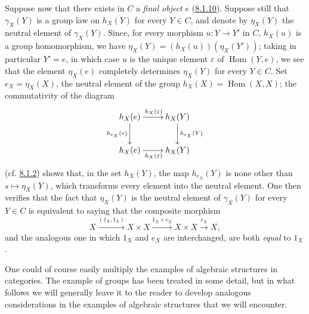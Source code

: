 \begin{env}[8.2.7]
\label{0.8.2.7}
Suppose now that there exists in $C$ a \emph{final object} $e$
(\hyperref[0.8.1.10]{8.1.10}). Suppose still that $\gamma_X(Y)$ is
a group law on $h_X(Y)$ for every $Y\in C$, and denote by
$\eta_X(Y)$ the neutral element of $\gamma_X(Y)$. Since, for every morphism
$u:Y\to Y'$ in $C$, $h_X(u)$ is a group homomorphism, we have
$\eta_X(Y)=(h_X(u))(\eta_X(Y'))$; taking in particular $Y'=e$, in which case
$u$ is the unique element $\varepsilon$ of $\operatorname{Hom}(Y,e)$, we see
that the element $\eta_X(e)$ completely determines $\eta_X(Y)$ for every
$Y\in C$. Set $e_X=\eta_X(X)$, the neutral element of the group
$h_X(X)=\operatorname{Hom}(X,X)$; the commutativity of the diagram
\[
  \xymatrix{
    h_X(e)\ar[r]^{h_X(\varepsilon)}\ar[d]_{h_{e_X}(e)} &
    h_X(Y)\ar[d]^{h_{e_X}(Y)}\\
    h_X(e)\ar[r]_{h_X(\varepsilon)} & h_X(Y)
  }
\]
(cf. \hyperref[0.8.1.2]{8.1.2}) shows that, in the set $h_X(Y)$,
the map $h_{e_X}(Y)$ is none other than
$s\mapsto\eta_X(Y)$, which transforms every element into the neutral element.
One then verifies that the fact that $\eta_X(Y)$ is the neutral element of
$\gamma_X(Y)$ for every $Y\in C$ is equivalent to saying that the composite
morphism
\[
  X\xrightarrow{(1_X,1_X)}X\times X
  \xrightarrow{1_X\times e_X}X\times X\xrightarrow{c_X}X,
\]
and the analogous one in which $1_X$ and $e_X$ are interchanged, are both
\emph{equal} to $1_X$.
\end{env}

\begin{env}[8.2.8]
\label{0.8.2.8}
One could of course easily multiply the examples of algebraic
structures in categories. The example of groups has been treated in some
detail, but in what follows we will generally leave it to the reader to
develop analogous considerations in the examples of algebraic structures
that we will encounter.
\end{env}

